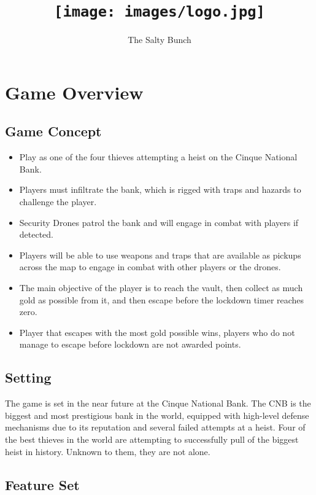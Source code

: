 \documentclass[14pt]{report}
\title{\texttt{[image: images/logo.jpg]}}
\author{The Salty Bunch}
\begin{document}
\maketitle


\tableofcontents


\chapter{Game Overview}

\section{Game Concept}

\begin{itemize}
    \item Play as one of the four thieves attempting a heist on the Cinque National Bank.
    \item Players must infiltrate the bank, which is rigged with traps and hazards to challenge the player.
    \item Security Drones patrol the bank and will engage in combat with players if detected.
    \item Players will be able to use weapons and traps that are available as pickups across the map to engage in combat with other players or the drones.
    \item The main objective of the player is to reach the vault, then collect as much gold as possible from it, and then escape before the lockdown timer reaches zero.
    \item Player that escapes with the most gold possible wins, players who do not manage to escape before lockdown are not awarded points.
\end{itemize}

\section{Setting}

The game is set in the near future at the Cinque National Bank. The CNB is the biggest and most prestigious bank in the world, equipped with high-level defense mechanisms due to its reputation and several failed attempts at a heist. Four of the best thieves in the world are attempting to successfully pull of the biggest heist in history. Unknown to them, they are not alone.

\section{Feature Set}
\end{document}
